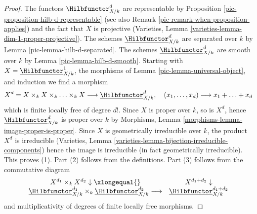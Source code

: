 \begin{proof}

The functors $\Hilbfunctor^d_{X/k}$ are representable by
Proposition \ref{pic-proposition-hilb-d-representable}
(see also Remark \ref{pic-remark-when-proposition-applies})
and the fact that $X$ is projective
(Varieties, Lemma \ref{varieties-lemma-dim-1-proper-projective}).
The schemes $\underline{\Hilbfunctor}^d_{X/k}$ are separated
over $k$ by Lemma \ref{pic-lemma-hilb-d-separated}.
The schemes $\underline{\Hilbfunctor}^d_{X/k}$ are smooth
over $k$ by Lemma \ref{pic-lemma-hilb-d-smooth}.
Starting with $X = \underline{\Hilbfunctor}^1_{X/k}$,
the morphisms of Lemma \ref{pic-lemma-universal-object},
and induction we find a morphism
$$
X^d = X \times_k X \times_k \ldots \times_k X \longrightarrow
\underline{\Hilbfunctor}^d_{X/k},\quad
(x_1, \ldots, x_d) \longrightarrow x_1 + \ldots + x_d
$$
which is finite locally free of degree $d!$. Since $X$ is
proper over $k$, so is $X^d$, hence
$\underline{\Hilbfunctor}^d_{X/k}$ is proper over $k$ by
Morphisms, Lemma \ref{morphisms-lemma-image-proper-is-proper}.
Since $X$ is geometrically irreducible over $k$, the product
$X^d$ is irreducible
(Varieties, Lemma \ref{varieties-lemma-bijection-irreducible-components})
hence the image is irreducible (in fact geometrically irreducible).
This proves (1). Part (2) follows from the definitions. Part (3) follows
from the commutative diagram
$$
\begin{array}{cc}X^{d_1} \times_k X^{d_2} \downarrow\xlongequal{} & X^{d_1 + d_2} \downarrow \\ \underline{\Hilbfunctor}^{d_1}_{X/k}
\times_k
\underline{\Hilbfunctor}^{d_2}_{X/k}
\longrightarrow & \underline{\Hilbfunctor}^{d_1 + d_2}_{X/k}\end{array}
$$
and multiplicativity of degrees of finite locally free morphisms.
\end{proof}

